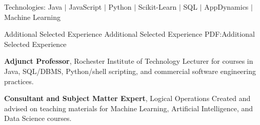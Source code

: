\documentclass[MMMMyyyy,nonstopmode]{simpleresumecv_stacked}
\newcommand{\tech}[1]{\Gap\textrm{Technologies:} #1}
\newcommand{\comment}[1]{\ignorespaces} %
\newif\ifLOCATION
\newif\ifLONG
\newif\ifNOTSELECTED
\begin{document}
\begin{Body}
\begin{Detail}
\tech{Java $|$ JavaScript $|$ Python $|$ Scikit-Learn $|$ \comment{TensorFlow $|$} SQL $|$ AppDynamics $|$ Machine Learning}
\fi

\end{Detail}

\BigGap

\Section
{Additional Selected Experience}
{Additional Selected Experience}
{PDF:Additional Selected Experience}

\Entry
\textbf{Adjunct Professor}, Rochester Institute of Technology
\BulletItem 
Lecturer for courses in Java, SQL/DBMS, Python/shell scripting, and commercial software engineering practices.

\Entry
\textbf{Consultant and Subject Matter Expert}, Logical Operations %
\hfill
\BulletItem
Created and advised on teaching materials for Machine Learning, Artificial Intelligence, and Data Science courses.


\ifLOCATION
\hfill
Rochester, New York
\fi



\ifNOTSELECTED
\Entry
\textbf{Lead Software Engineer, Paychex}
\hfill

\begin{Detail}
Led team of 6 to create three public-facing fullstack applications in Java and JavaScript.
\end{Detail}

\ifLONG

\Entry
\href{http://www.paychex.com/}
{\textbf{Paychex}}
\hfill 
\DatestampY{2005} -- \DatestampY{2010}

Lead Developer
\ifLOCATION
\hfill
Rochester, New York
\fi


\end{Body}
\end{document}
